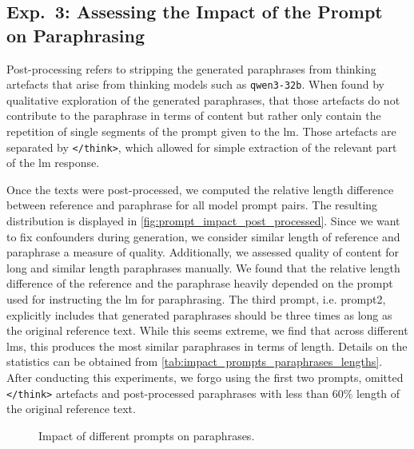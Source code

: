 \subsection{Exp.\ 3: Assessing the Impact of the Prompt on Paraphrasing}
\label{subsec:prompt_impact_res}


Post-processing refers to stripping the generated paraphrases from thinking artefacts that arise from thinking models such as \texttt{qwen3-32b}.
When found by qualitative exploration of the generated paraphrases, that those artefacts do not contribute to the paraphrase in terms of content but rather only contain the repetition of single segments of the prompt given to the \ac{lm}.
Those artefacts are separated by \texttt{</think>}, which allowed for simple extraction of the relevant part of the \ac{lm} response.

Once the texts were post-processed, we computed the relative length difference between reference and paraphrase for all model prompt pairs.
The resulting distribution is displayed in \autoref{fig:prompt_impact_post_processed}.
Since we want to fix confounders during \imp{} generation, we consider similar length of reference and paraphrase a measure of quality.
Additionally, we assessed quality of content for long and similar length paraphrases manually.
We found that the relative length difference of the reference and the paraphrase heavily depended on the prompt used for instructing the \ac{lm} for paraphrasing.
The third prompt, i.e. prompt2, explicitly includes that generated paraphrases should be three times as long as the original reference text.
While this seems extreme, we find that across different \acp{lm}, this produces the most similar paraphrases in terms of length.
Details on the statistics can be obtained from \autoref{tab:impact_prompts_paraphrases_lengths}.
After conducting this experiments, we forgo using the first two prompts, omitted \texttt{</think>} artefacts and post-processed paraphrases with less than $60\%$ length of the original reference text.

\begin{figure}[htbp]
    \centering
    
    \caption[Impact of different prompts on paraphrases.]{
    Impact of different prompts on paraphrases.   
    }
    \label{fig:prompt_impact_post_processed}
\end{figure}



